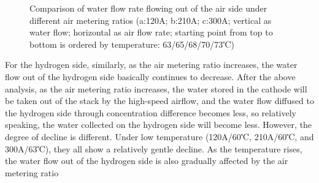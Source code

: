 \begin{figure}
{	}
	\caption{Comparison of water flow rate flowing out of the air side under different air metering ratios (a:120A; b:210A; c:300A; vertical as water flow; horizontal as air flow rate; starting point from top to bottom is ordered by temperature: 63/65/68/70/73℃)}
\end{figure}
\par
For the hydrogen side, similarly, as the air metering ratio increases, the water flow out of the hydrogen side basically continues to decrease. After the above analysis, as the air metering ratio increases, the water stored in the cathode will be taken out of the stack by the high-speed airflow, and the water flow diffused to the hydrogen side through concentration difference becomes less, so relatively speaking, the water collected on the hydrogen side will become less. However, the degree of decline is different. Under low temperature (120A/60℃, 210A/60℃, and 300A/63℃), they all show a relatively gentle decline. As the temperature rises, the water flow out of the hydrogen side is also gradually affected by the air metering ratio
